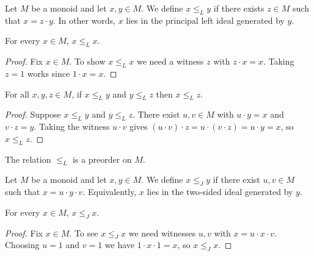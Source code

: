 \begin{definition}
\label{def:LRel}
Let \(M\) be a monoid and let \(x,y\in M\).  We define
\(x \le_L y\) if there exists \(z\in M\) such that \(x = z\cdot y\).
In other words, \(x\) lies in the principal left ideal generated by \(y\).
\leanok
\end{definition}
\begin{lemma}[Reflexivity of \(\le_L\)]
\label{lem:LRel-refl}
For every \(x\in M\), \(x \le_L x\).
\leanok
{}
\end{lemma}
\begin{proof}
\leanok
Fix \(x\in M\).  To show \(x \le_L x\) we need a witness \(z\) with \(z\cdot x = x\).  Taking \(z=1\) works since \(1\cdot x = x\).
\end{proof}

\begin{lemma}[Transitivity of \(\le_L\)]
\label{lem:LRel-trans}
For all \(x,y,z\in M\), if \(x \le_L y\) and \(y \le_L z\) then \(x \le_L z\).
\leanok
{}
\end{lemma}
\begin{proof}
\leanok
Suppose \(x \le_L y\) and \(y \le_L z\).  There exist \(u,v\in M\) with \(u\cdot y = x\) and \(v\cdot z = y\).  Taking the witness \(u\cdot v\) gives \((u\cdot v)\cdot z = u\cdot (v\cdot z) = u\cdot y = x\), so \(x \le_L z\).
\end{proof}

\begin{lemma}
\label{lem:LRel-isPreorder}
The relation \(\le_L\) is a preorder on \(M\).
\leanok
{}
\end{lemma}

\begin{definition}
\label{def:JRel}
Let \(M\) be a monoid and let \(x,y\in M\).  We define
\(x \le_J y\) if there exist \(u,v\in M\) such that \(x = u\cdot y\cdot v\).
Equivalently, \(x\) lies in the two‑sided ideal generated by \(y\).
\leanok
\end{definition}
\begin{lemma}[Reflexivity of \(\le_J\)]
\label{lem:JRel-refl}
For every \(x\in M\), \(x \le_J x\).
\leanok
{}
\end{lemma}
\begin{proof}
\leanok
Fix \(x\in M\).  To see \(x \le_J x\) we need witnesses \(u,v\) with \(x = u\cdot x \cdot v\).  Choosing \(u=1\) and \(v=1\) we have \(1\cdot x\cdot 1 = x\), so \(x \le_J x\).
\end{proof}

